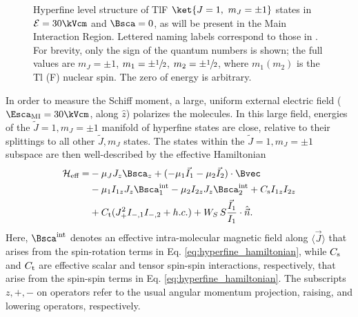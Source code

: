 \begin{figure}
	\centering
	
	\caption{Hyperfine level structure of TlF $\ket{J=1,\ m_J=\pm1}$ states in $\mathcal{E}=30\kVcm$ and $\Bsca = 0$, as will be present in the Main Interaction Region.  Lettered naming labels correspond to those in \cite{wilkening1984search}. For brevity, only the sign of the quantum numbers is shown; the full values are $m_J =\pm 1$, $m_1=\pm \sfrac{1}{2}$, $m_2=\pm\sfrac{1}{2}$, where $m_1 (m_2)$ is the Tl (F) nuclear spin. The zero of energy is arbitrary.}
	\label{fig:levels_interaction_region}
\end{figure}
In order to measure the Schiff moment, a large, uniform external electric field ($\Esca_\mathrm{MI}=30\kVcm$, along $\hat{z}$) polarizes the molecules. In this large field, energies of the $\widetilde{J}=1,m_J=\pm 1$ manifold of hyperfine states are close, relative to their splittings to all other $\widetilde{J},m_J$ states. The states within the $\widetilde{J}=1,m_J=\pm 1$ subspace are then well-described \cite{cho1991search} by the effective Hamiltonian\footnotemark
\begin{equation}
    \begin{split}
        \mathcal{H}_\textrm{eff} =& -\mu_J J_z \Bsca_z + (-\mu_1 \vec{I}_1 -\mu_2 \vec{I}_2)\cdot \Bvec  \\
        &- \mu_1 I_{1z} J_z \Bsca^{\rm int}_1 - \mu_2 I_{2z} J_z \Bsca^{\rm int}_2 + C_{\rm s} I_{1z} I_{2z} \\
        &+ C_{\rm t} (J_+^2I_{-,1}I_{-,2} + h.c.) + W_S\,S \frac{\vec{I}_1}{I_1}\cdot\hat{\vec{n}}.
    \end{split}
\end{equation}
Here,  $\Bsca^{\rm int}$ denotes an effective intra-molecular magnetic field along $\langle \vec{J} \rangle$ that arises from the spin-rotation terms in Eq. \ref{eq:hyperfine_hamiltonian}, while $C_{\rm s}$ and $C_{\rm t}$ are effective scalar and tensor spin-spin interactions, respectively, that arise from the spin-spin terms in Eq. \ref{eq:hyperfine_hamiltonian}.  The subscripts $z,+,-$ on operators refer to the usual angular momentum projection, raising, and lowering operators, respectively.
